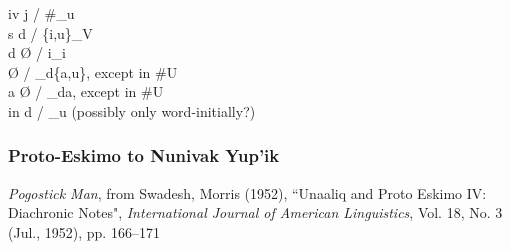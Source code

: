 \documentclass[11pt]{article}
\begin{document}
iv \textrightarrow\hspace{0pt} j / \#_u \\
s \textrightarrow\hspace{0pt} d / \{i,u\}_V \\
d \textrightarrow\hspace{0pt} \O\hspace{0pt} / i_i \\
 \textrightarrow\hspace{0pt} \O\hspace{0pt} / _d\{a,u\}, except in \#U \\
a \textrightarrow\hspace{0pt} \O\hspace{0pt} / _da, except in \#U \\
in \textrightarrow\hspace{0pt} d / _u (possibly only word-initially?)

\subsubsection{Proto-Eskimo to Nunivak Yup'ik}{\it Pogostick Man}, from Swadesh, Morris (1952), \textquotedblleft Unaaliq and Proto Eskimo IV: Diachronic Notes", \textit{International Journal of American Linguistics}, Vol. 18, No. 3 (Jul., 1952), pp. 166--171
\end{document}
